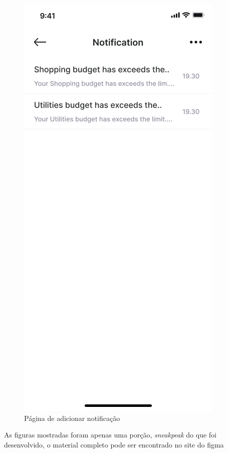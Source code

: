 \begin{figure}[!htb]
    \centering
    \caption{Página de adicionar notificação}
    \includegraphics[scale=0.3]{images/Notification.png}
\end{figure}


As figuras mostradas foram apenas uma porção, \textit{sneakpeak} do que foi desenvolvido, o material completo pode ser encontrado no site do figma